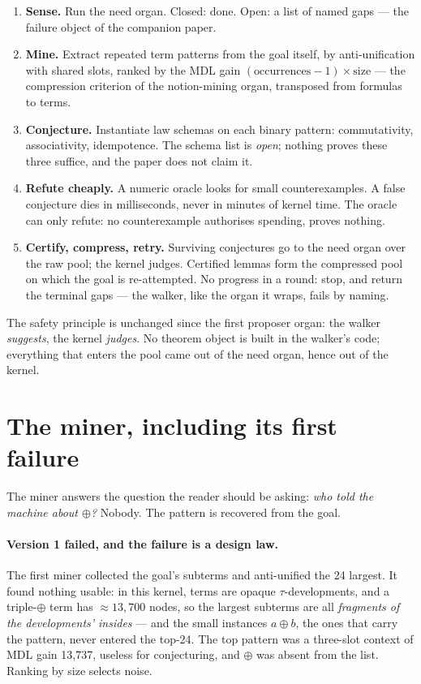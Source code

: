 \documentclass[11pt]{article}
\theoremstyle{remark}\newtheorem{remark}{Remark}
\begin{document}
\begin{enumerate}
\item \textbf{Sense.} Run the need organ. Closed: done. Open: a list of named
  gaps --- the failure object of the companion paper.
\item \textbf{Mine.} Extract repeated term patterns from the goal itself, by
  anti-unification with shared slots, ranked by the MDL gain
  $(\mathrm{occurrences}-1) \times \mathrm{size}$ --- the compression
  criterion of the notion-mining organ, transposed from formulas to terms.
\item \textbf{Conjecture.} Instantiate law schemas on each binary pattern:
  commutativity, associativity, idempotence. The schema list is \emph{open};
  nothing proves these three suffice, and the paper does not claim it.
\item \textbf{Refute cheaply.} A numeric oracle looks for small
  counterexamples. A false conjecture dies in milliseconds, never in minutes
  of kernel time. The oracle can only refute: no counterexample authorises
  spending, proves nothing.
\item \textbf{Certify, compress, retry.} Surviving conjectures go to the need
  organ over the raw pool; the kernel judges. Certified lemmas form the
  compressed pool on which the goal is re-attempted. No progress in a round:
  stop, and return the terminal gaps --- the walker, like the organ it wraps,
  fails by naming.
\end{enumerate}

The safety principle is unchanged since the first proposer organ: the walker
\emph{suggests}, the kernel \emph{judges}. No theorem object is built in the
walker's code; everything that enters the pool came out of the need organ,
hence out of the kernel.

\section{The miner, including its first failure}
\label{sec:mineur}

The miner answers the question the reader should be asking: \emph{who told
the machine about $\oplus$?} Nobody. The pattern is recovered from the goal.

\paragraph{Version 1 failed, and the failure is a design law.} The first
miner collected the goal's subterms and anti-unified the 24 largest. It found
nothing usable: in this kernel, terms are opaque $\tau$-developments, and a
triple-$\oplus$ term has ${\approx}13{,}700$ nodes, so the largest subterms
are all \emph{fragments of the developments' insides} --- and the small
instances $a \oplus b$, the ones that carry the pattern, never entered the
top-24. The top pattern was a three-slot context of MDL gain 13{,}737,
useless for conjecturing, and $\oplus$ was absent from the list. Ranking by
size selects noise.
\end{document}
